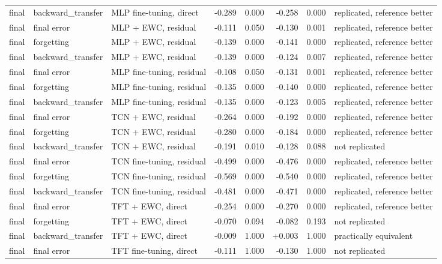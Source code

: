 \begin{table}[t]
\begin{tabular}{lllrrrrl}
    final & backward\_transfer & MLP fine-tuning, direct & -0.289 & 0.000 & -0.258 & 0.000 & replicated, reference better \\
    final & final error & MLP + EWC, residual & -0.111 & 0.050 & -0.130 & 0.001 & replicated, reference better \\
    final & forgetting & MLP + EWC, residual & -0.139 & 0.000 & -0.141 & 0.000 & replicated, reference better \\
    final & backward\_transfer & MLP + EWC, residual & -0.139 & 0.000 & -0.124 & 0.007 & replicated, reference better \\
    final & final error & MLP fine-tuning, residual & -0.108 & 0.050 & -0.131 & 0.001 & replicated, reference better \\
    final & forgetting & MLP fine-tuning, residual & -0.135 & 0.000 & -0.140 & 0.000 & replicated, reference better \\
    final & backward\_transfer & MLP fine-tuning, residual & -0.135 & 0.000 & -0.123 & 0.005 & replicated, reference better \\
    final & final error & TCN + EWC, residual & -0.264 & 0.000 & -0.192 & 0.000 & replicated, reference better \\
    final & forgetting & TCN + EWC, residual & -0.280 & 0.000 & -0.184 & 0.000 & replicated, reference better \\
    final & backward\_transfer & TCN + EWC, residual & -0.191 & 0.010 & -0.128 & 0.088 & not replicated \\
    final & final error & TCN fine-tuning, residual & -0.499 & 0.000 & -0.476 & 0.000 & replicated, reference better \\
    final & forgetting & TCN fine-tuning, residual & -0.569 & 0.000 & -0.540 & 0.000 & replicated, reference better \\
    final & backward\_transfer & TCN fine-tuning, residual & -0.481 & 0.000 & -0.471 & 0.000 & replicated, reference better \\
    final & final error & TFT + EWC, direct & -0.254 & 0.000 & -0.270 & 0.000 & replicated, reference better \\
    final & forgetting & TFT + EWC, direct & -0.070 & 0.094 & -0.082 & 0.193 & not replicated \\
    final & backward\_transfer & TFT + EWC, direct & -0.009 & 1.000 & +0.003 & 1.000 & practically equivalent \\
    final & final error & TFT fine-tuning, direct & -0.111 & 1.000 & -0.130 & 1.000 & not replicated \\

\end{tabular}
\end{table}
